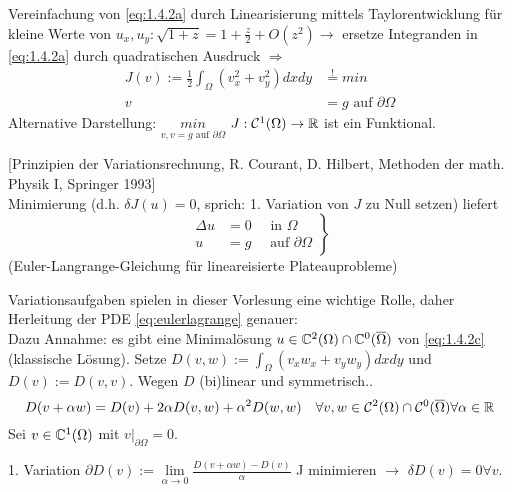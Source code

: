 \begin{beispiel}
    Vereinfachung von \eqref{eq:1.4.2a} durch Linearisierung mittels Taylorentwicklung für kleine Werte von $u_x,u_y: \sqrt{1+z} = 1 + \frac{z}{2} + O(z^2) \to$ ersetze Integranden in \eqref{eq:1.4.2a} durch quadratischen Ausdruck $\Rightarrow$
    \begin{equation} %
        \begin{aligned}
            J(v) := \frac{1}{2}\int_{\Omega} (v_x^2+v_y^2) dx dy & \overset{!}{=} min\\
            v & = g \text{ auf } \partial\Omega
        \end{aligned}
        \label{eq:1.4.2c}
    \end{equation}
    Alternative Darstellung: $\underset{v, v=g \text{ auf } \partial\Omega}{min}$
    $J:\mathcal{C}^1(\Omega) \to \mathbb{R}$ ist ein Funktional.

    [Prinzipien der Variationsrechnung, R. Courant, D. Hilbert, Methoden der math. Physik I, Springer 1993]\\

    Minimierung (d.h. $\delta J(u) = 0$, sprich: 1. Variation von $J$ zu Null setzen) liefert
    \begin{equation} %
        \left.
            \begin{aligned}
                \Delta u & = 0 \quad \text{ in } \Omega\\
                u & = g \quad \text{ auf } \partial\Omega
            \end{aligned}
        \right\}
        \label{eq:eulerlagrange}
    \end{equation}
    (Euler-Langrange-Gleichung für lineareisierte Plateauprobleme)

    Variationsaufgaben spielen in dieser Vorlesung eine wichtige Rolle, daher Herleitung der PDE \eqref{eq:eulerlagrange} genauer:\\

    Dazu Annahme: es gibt eine Minimalösung $u\in \mathbb{C}^2(\Omega) \cap \mathbb{C}^0(\overline{\Omega})$ von \eqref{eq:1.4.2c} (klassische Lösung). Setze $D(v,w) := \int_{\Omega} (v_xw_x + v_yw_y) dx dy$ und $D(v):= D(v,v)$. Wegen $D$ (bi)linear und symmetrisch..
    \[
        D(v + \alpha w) = D(v) + 2\alpha D(v,w) + \alpha^2 D(w,w) \quad \forall v,w \in \mathcal{C}^2(\Omega) \cap \mathcal{C}^0(\overline{\Omega}) \forall \alpha\in\mathbb{R}
    \]
    Sei $v\in\mathbb{C}^1(\Omega)$ mit $v|_{\partial\Omega} = 0$. 

    1. Variation $\partial D(v) := \underset{\alpha\to0}{\lim} \frac{D(v+\alpha w) -D(v)}{\alpha}$
    J minimieren $\to$ $\delta D(v) = 0 \forall v$. 


\end{beispiel}
